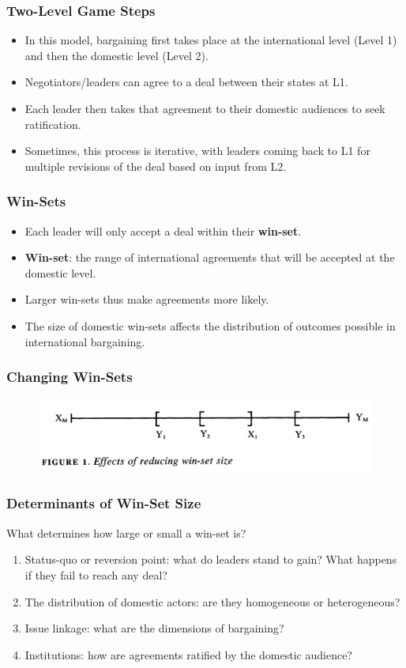 \documentclass{beamer}
\begin{document}
\begin{frame} 
\frametitle{\LARGE{Two-Level Game Steps}}
	\begin{itemize}
		\item In this model, bargaining first takes place at the international level (Level 1) and then the domestic level (Level 2). \pause
		\item Negotiators/leaders can agree to a deal between their states at L1. \pause
		\item Each leader then takes that agreement to their domestic audiences to seek ratification. \pause
		\item Sometimes, this process is iterative, with leaders coming back to L1 for multiple revisions of the deal based on input from L2.
	\end{itemize}
\end{frame}

\begin{frame} 
\frametitle{\LARGE{Win-Sets}}
	\begin{itemize}
		\item Each leader will only accept a deal within their \textbf{win-set}. \pause
		\item \textbf{Win-set}: the range of international agreements that will be accepted at the domestic level. \pause
		\item Larger win-sets thus make agreements more likely. \pause
		\item The size of domestic win-sets affects the distribution of outcomes possible in international bargaining.
	\end{itemize}
\end{frame}

\begin{frame} 
\frametitle{\LARGE{Changing Win-Sets}}
\begin{figure}[ht!]
	\centering
\includegraphics[width=\textwidth,height=0.8\textheight,keepaspectratio]{./winset.png}
\end{figure}
\end{frame}

\begin{frame} 
\frametitle{\LARGE{Determinants of Win-Set Size}}
 What determines how large or small a win-set is? \pause
	\begin{enumerate}
		\item Status-quo or reversion point: what do leaders stand to gain? What happens if they fail to reach any deal? \pause
		\item The distribution of domestic actors: are they homogeneous or heterogeneous?    \pause 
		\item Issue linkage: what are the dimensions of bargaining? \pause 
		\item Institutions: how are agreements ratified by the domestic audience?
	\end{enumerate}
\end{frame}
\end{document}
